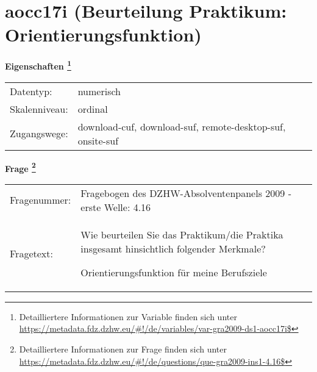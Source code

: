 
    \setcounter{footnote}{0}

    \vspace*{-1.8cm}
	\section{aocc17i (Beurteilung Praktikum: Orientierungsfunktion)}
	\label{section:aocc17i}



    \vspace*{0.5cm}
    \noindent\textbf{Eigenschaften
	\footnote{Detailliertere Informationen zur Variable finden sich unter
		\url{https://metadata.fdz.dzhw.eu/\#!/de/variables/var-gra2009-ds1-aocc17i$}}}\\
	\begin{tabularx}{\hsize}{@{}lX}
	Datentyp: & numerisch \\
	Skalenniveau: & ordinal \\
	Zugangswege: &
	  download-cuf, 
	  download-suf, 
	  remote-desktop-suf, 
	  onsite-suf
 \\
    \end{tabularx}



				\vspace*{0.5cm}
                \noindent\textbf{Frage
	                \footnote{Detailliertere Informationen zur Frage finden sich unter
		              \url{https://metadata.fdz.dzhw.eu/\#!/de/questions/que-gra2009-ins1-4.16$}}}\\
				\begin{tabularx}{\hsize}{@{}lX}
					Fragenummer: &
					  Fragebogen des DZHW-Absolventenpanels 2009 - erste Welle:
					  4.16
 \\
					Fragetext: & Wie beurteilen Sie das Praktikum/die Praktika insgesamt hinsichtlich folgender Merkmale?\par  Orientierungsfunktion für meine Berufsziele \\
				\end{tabularx}





